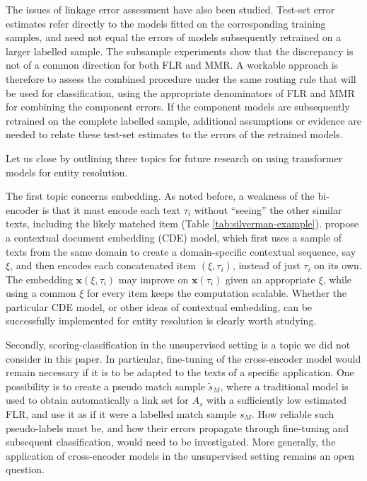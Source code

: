 The issues of linkage error assessment have also been studied. Test-set error estimates
refer directly to the models fitted on the corresponding training samples, and need not
equal the errors of models subsequently retrained on a larger labelled sample. The
subsample experiments show that the discrepancy is not of a common direction for both
FLR and MMR. A workable approach is therefore to assess the combined procedure under
the same routing rule that will be used for classification, using the appropriate
denominators of FLR and MMR for combining the component errors. If the component
models are subsequently retrained on the complete labelled sample, additional assumptions
or evidence are needed to relate these test-set estimates to the errors of the retrained
models.

Let us close by outlining three topics for future research on using transformer models for
entity resolution.

The first topic concerns embedding. As noted before, a weakness of the bi-encoder is
that it must encode each text $\tau_i$ without ``seeing'' the other similar texts, including
the likely matched item (Table \ref{tab:silverman-example}). \citet{morris2025contextual} propose a contextual document embedding (CDE) model,
which first uses a sample of texts from the same domain to create a domain-specific
contextual sequence, say $\xi$, and then encodes each concatenated item
$(\xi,\tau_i)$, instead of just $\tau_i$ on its own. The embedding
$\mathbf{x}(\xi,\tau_i)$ may improve on $\mathbf{x}(\tau_i)$ given an appropriate
$\xi$, while using a common $\xi$ for every item keeps the computation scalable.
Whether the particular CDE model, or other ideas of contextual embedding, can be
successfully implemented for entity resolution is clearly worth studying.

Secondly, scoring-classification in the unsupervised setting is a topic we did not consider
in this paper. In particular, fine-tuning of the cross-encoder model would remain
necessary if it is to be adapted to the texts of a specific application. One possibility is
to create a pseudo match sample $\widetilde{s}_M$, where a traditional model is used to
obtain automatically a link set for $A_s$ with a sufficiently low estimated FLR, and use
it as if it were a labelled match sample $s_M$. How reliable such pseudo-labels must be,
and how their errors propagate through fine-tuning and subsequent classification, would
need to be investigated. More generally, the application of cross-encoder models in the
unsupervised setting remains an open question.

